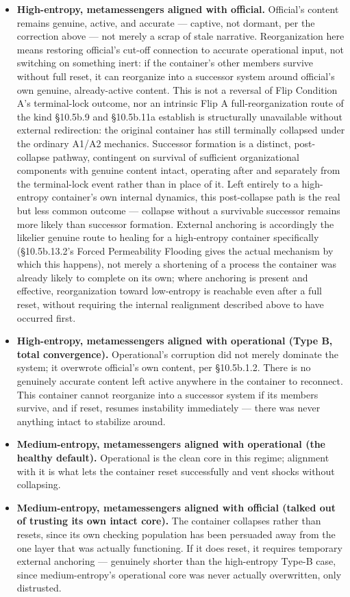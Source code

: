 \documentclass[
]{article}
\begin{document}
\begin{itemize}
\item
  \textbf{High-entropy, metamessengers aligned with official.}
  Official's content remains genuine, active, and accurate --- captive,
  not dormant, per the correction above --- not merely a scrap of stale
  narrative. Reorganization here means restoring official's cut-off
  connection to accurate operational input, not switching on something
  inert: if the container's other members survive without full reset, it
  can reorganize into a successor system around official's own genuine,
  already-active content. This is not a reversal of Flip Condition A's
  terminal-lock outcome, nor an intrinsic Flip A full-reorganization
  route of the kind §10.5b.9 and §10.5b.11a establish is structurally
  unavailable without external redirection: the original container has
  still terminally collapsed under the ordinary A1/A2 mechanics.
  Successor formation is a distinct, post-collapse pathway, contingent
  on survival of sufficient organizational components with genuine
  content intact, operating after and separately from the terminal-lock
  event rather than in place of it. Left entirely to a high-entropy
  container's own internal dynamics, this post-collapse path is the real
  but less common outcome --- collapse without a survivable successor
  remains more likely than successor formation. External anchoring is
  accordingly the likelier genuine route to healing for a high-entropy
  container specifically (§10.5b.13.2's Forced Permeability Flooding
  gives the actual mechanism by which this happens), not merely a
  shortening of a process the container was already likely to complete
  on its own; where anchoring is present and effective, reorganization
  toward low-entropy is reachable even after a full reset, without
  requiring the internal realignment described above to have occurred
  first.
\item
  \textbf{High-entropy, metamessengers aligned with operational (Type B,
  total convergence).} Operational's corruption did not merely dominate
  the system; it overwrote official's own content, per §10.5b.1.2. There
  is no genuinely accurate content left active anywhere in the container
  to reconnect. This container cannot reorganize into a successor system
  if its members survive, and if reset, resumes instability immediately
  --- there was never anything intact to stabilize around.
\item
  \textbf{Medium-entropy, metamessengers aligned with operational (the
  healthy default).} Operational is the clean core in this regime;
  alignment with it is what lets the container reset successfully and
  vent shocks without collapsing.
\item
  \textbf{Medium-entropy, metamessengers aligned with official (talked
  out of trusting its own intact core).} The container collapses rather
  than resets, since its own checking population has been persuaded away
  from the one layer that was actually functioning. If it does reset, it
  requires temporary external anchoring --- genuinely shorter than the
  high-entropy Type-B case, since medium-entropy's operational core was
  never actually overwritten, only distrusted.
\end{itemize}
\end{document}
